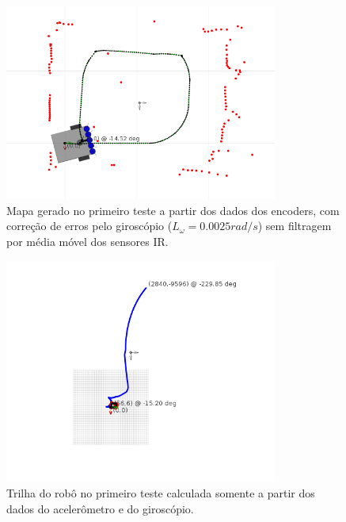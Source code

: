 \begin{figure}[H]
	\centering
	\includegraphics[width=0.8\textwidth]{./figuras/testes/teste1/mapa_encoders_giro_media0.png}
	\caption{Mapa gerado no primeiro teste a partir dos dados dos encoders, com correção de erros pelo giroscópio ($L_\omega = 0.0025 \unit{rad/s}$) sem filtragem por média móvel dos sensores IR.}
	\label{fig:teste1_mapa_encoders_giro_media0}
\end{figure}

\begin{figure}[H]
	\centering
	\includegraphics[width=0.8\textwidth]{./figuras/testes/teste1/mapa_acelerometro.png}
	\caption{Trilha do robô no primeiro teste calculada somente a partir dos dados do acelerômetro e do giroscópio.}
	\label{fig:teste1_mapa_acelerometro}
\end{figure}


